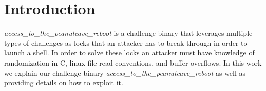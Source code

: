 \section{Introduction}
\emph{access\_to\_the\_peanutcave\_reboot} is a challenge binary that leverages multiple types of challenges as locks that an attacker has to break through in order to launch a shell. In order to solve these locks an attacker must have knowledge of randomization in C, linux file read conventions, and buffer overflows. In this work we explain our challenge binary \emph{access\_to\_the\_peanutcave\_reboot} as well as providing details on how to exploit it. 
